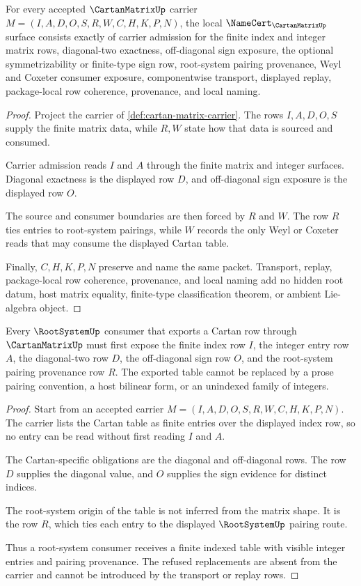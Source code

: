 \begin{theorem}
\label{thm:cartan-matrix-namecert-obligations}
For every accepted $\CartanMatrixUp$ carrier $M=(I,A,D,O,S,R,W,C,H,K,P,N)$, the local $\NameCert_{\CartanMatrixUp}$ surface consists exactly of carrier admission for the finite index and integer matrix rows, diagonal-two exactness, off-diagonal sign exposure, the optional symmetrizability or finite-type sign row, root-system pairing provenance, Weyl and Coxeter consumer exposure, componentwise transport, displayed replay, package-local row coherence, provenance, and local naming.
\end{theorem}
\begin{proof}
Project the carrier of \autoref{def:cartan-matrix-carrier}. The rows $I,A,D,O,S$ supply the finite matrix data, while $R,W$ state how that data is sourced and consumed.

Carrier admission reads $I$ and $A$ through the finite matrix and integer surfaces. Diagonal exactness is the displayed row $D$, and off-diagonal sign exposure is the displayed row $O$.

The source and consumer boundaries are then forced by $R$ and $W$. The row $R$ ties entries to root-system pairings, while $W$ records the only Weyl or Coxeter reads that may consume the displayed Cartan table.

Finally, $C,H,K,P,N$ preserve and name the same packet. Transport, replay, package-local row coherence, provenance, and local naming add no hidden root datum, host matrix equality, finite-type classification theorem, or ambient Lie-algebra object.
\end{proof}

\begin{theorem}
\label{thm:cartan-matrix-root-system-consumer}
Every $\RootSystemUp$ consumer that exports a Cartan row through $\CartanMatrixUp$ must first expose the finite index row $I$, the integer entry row $A$, the diagonal-two row $D$, the off-diagonal sign row $O$, and the root-system pairing provenance row $R$. The exported table cannot be replaced by a prose pairing convention, a host bilinear form, or an unindexed family of integers.
\end{theorem}
\begin{proof}
Start from an accepted carrier $M=(I,A,D,O,S,R,W,C,H,K,P,N)$. The carrier lists the Cartan table as finite entries over the displayed index row, so no entry can be read without first reading $I$ and $A$.

The Cartan-specific obligations are the diagonal and off-diagonal rows. The row $D$ supplies the diagonal value, and $O$ supplies the sign evidence for distinct indices.

The root-system origin of the table is not inferred from the matrix shape. It is the row $R$, which ties each entry to the displayed $\RootSystemUp$ pairing route.

Thus a root-system consumer receives a finite indexed table with visible integer entries and pairing provenance. The refused replacements are absent from the carrier and cannot be introduced by the transport or replay rows.
\end{proof}

